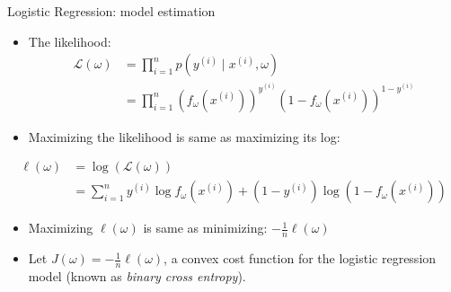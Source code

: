 \documentclass[
  9pt,
  ignorenonframetext,
  aspectratio=169,
  t, dvipsnames]{beamer}
\providecommand{\tightlist}{%
  \setlength{\itemsep}{0pt}\setlength{\parskip}{0pt}}\usepackage{longtable,booktabs,array}
\theoremstyle{definition}
\begin{document}
\begin{frame}{Logistic Regression: model estimation}
\protect\hypertarget{logistic-regression-model-estimation-2}{}
\vspace{-0.5cm}

\begin{itemize}
\tightlist
\item
  The \alert{likelihood}: \begin{align*}
  \mathcal{L}(\omega) &= \prod_{i=1}^{n} p\left(y^{(i)} \mid x^{(i)} , \omega\right) \\
                     &= \prod_{i=1}^{n}\left(f_{\omega}\left(x^{(i)}\right)\right)^{y^{(i)}}\left(1-f_{\omega}\left(x^{(i)}\right)\right)^{1-y^{(i)}}
  \end{align*}
\end{itemize}

\pause

\begin{itemize}
\tightlist
\item
  Maximizing the likelihood is same as maximizing its log:
\end{itemize}

\begin{align*}
  \ell(\omega) &= \log\left(\mathcal{L}(\omega)\right) \\
                     &= \sum_{i=1}^{n} y^{(i)} \log f_{\omega}\left(x^{(i)}\right)+\left(1-y^{(i)}\right) \log \left(1-f_{\omega}\left(x^{(i)}\right)\right)
\end{align*}

\begin{itemize}
\tightlist
\item
  Maximizing \(\ell(\omega)\) is same as minimizing:
  \(- \frac{1}{n} \ell(\omega)\)
\end{itemize}

\pause

\begin{itemize}
\tightlist
\item
  Let \(J(\omega) = - \frac{1}{n} \ell(\omega)\), a
  \alert{convex cost function} for the logistic regression model (known
  as \emph{binary cross entropy}).
\end{itemize}
\end{frame}
\end{document}
